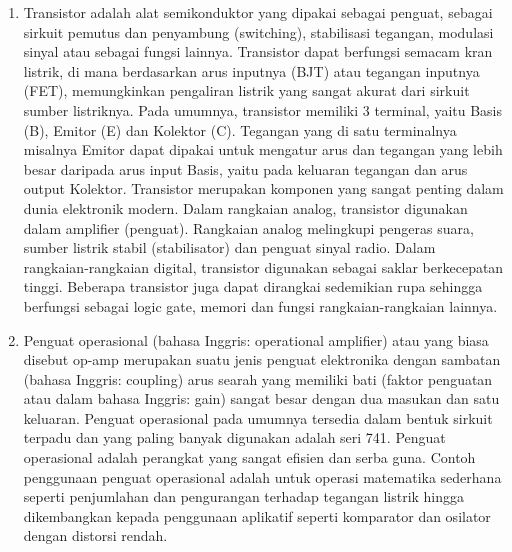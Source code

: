 \documentclass[12pt,a4paper]{article}
\begin{document}
\begin{enumerate}

\item Transistor adalah alat semikonduktor yang dipakai sebagai penguat, sebagai sirkuit pemutus dan penyambung (switching), stabilisasi tegangan, modulasi sinyal atau sebagai fungsi lainnya. Transistor dapat berfungsi semacam kran listrik, di mana berdasarkan arus inputnya (BJT) atau tegangan inputnya (FET), memungkinkan pengaliran listrik yang sangat akurat dari sirkuit sumber listriknya. Pada umumnya, transistor memiliki 3 terminal, yaitu Basis (B), Emitor (E) dan Kolektor (C). Tegangan yang di satu terminalnya misalnya Emitor dapat dipakai untuk mengatur arus dan tegangan yang lebih besar daripada arus input Basis, yaitu pada keluaran tegangan dan arus output Kolektor. Transistor merupakan komponen yang sangat penting dalam dunia elektronik modern. Dalam rangkaian analog, transistor digunakan dalam amplifier (penguat). Rangkaian analog melingkupi pengeras suara, sumber listrik stabil (stabilisator) dan penguat sinyal radio. Dalam rangkaian-rangkaian digital, transistor digunakan sebagai saklar berkecepatan tinggi. Beberapa transistor juga dapat dirangkai sedemikian rupa sehingga berfungsi sebagai logic gate, memori dan fungsi rangkaian-rangkaian lainnya.

\item Penguat operasional (bahasa Inggris: operational amplifier) atau yang biasa disebut op-amp merupakan suatu jenis penguat elektronika dengan sambatan (bahasa Inggris: coupling) arus searah yang memiliki bati (faktor penguatan atau dalam bahasa Inggris: gain) sangat besar dengan dua masukan dan satu keluaran. Penguat operasional pada umumnya tersedia dalam bentuk sirkuit terpadu dan yang paling banyak digunakan adalah seri 741.
Penguat operasional adalah perangkat yang sangat efisien dan serba guna. Contoh penggunaan penguat operasional adalah untuk operasi matematika sederhana seperti penjumlahan dan pengurangan terhadap tegangan listrik hingga dikembangkan kepada penggunaan aplikatif seperti komparator dan osilator dengan distorsi rendah.


\end{enumerate}
\end{document}
